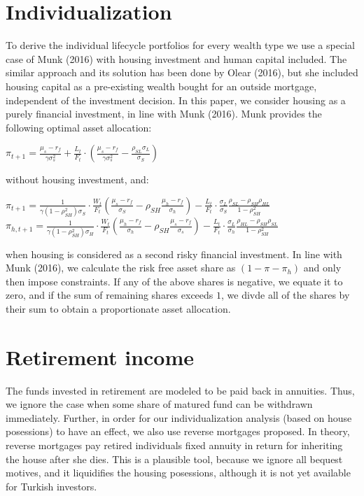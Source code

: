 \section{Individualization}

To derive the individual lifecycle portfolios for every wealth type we use a special case of Munk (2016) with housing investment and human capital included. The similar approach and its solution has been done by Olear (2016), but she included housing capital as a pre-existing wealth bought for an outside mortgage, independent of the investment decision. In this paper, we consider housing as a purely financial investment, in line with Munk (2016). Munk provides the following optimal asset allocation:


\begin{center}
	$\pi_{t+1} = \frac{\mu_s - r_f}{\gamma \sigma^2_s}  + \frac{L_t}{F_t} \cdot \left(\frac{\mu_s - r_f}{\gamma \sigma^2_s} - \frac{\rho_{SL}\sigma_L}{\sigma_S} \right)$
\end{center}

without housing investment, and:

\begin{center}
	$\pi_{t+1} = \frac{1}{\gamma (1 - \rho^2_{SH}) \sigma_S} \cdot \frac{W_t}{F_t} \left( \frac{\mu_s - r_f}{\sigma_S} - \rho_{SH} \frac{\mu_h - r_f}{\sigma_h} \right) - \frac{L_t}{F_t} \cdot \frac{\sigma_L}{\sigma_S} \frac{\rho_{SL} - \rho_{SH}\rho_{HL}}{1 - \rho^2_{SH}}$\\
	$\pi_{h,t+1} = \frac{1}{\gamma (1 - \rho^2_{SH}) \sigma_H} \cdot \frac{W_t}{F_t} \left( \frac{\mu_h - r_f}{\sigma_h} - \rho_{SH} \frac{\mu_s - r_f}{\sigma_s} \right) - \frac{L_t}{F_t} \cdot \frac{\sigma_L}{\sigma_h} \frac{\rho_{HL} - \rho_{SH}\rho_{SL}}{1 - \rho^2_{SH}}$
\end{center}

when housing is considered as a second risky financial investment. In line with Munk (2016), we calculate the risk free asset share as $\left( 1 - \pi - \pi_h \right)$ and only then impose constraints. If any of the above shares is negative, we equate it to zero, and if the sum of remaining shares exceeds $1$, we divde all of the shares by their sum to obtain a proportionate asset allocation. 

\section{Retirement income}

The funds invested in retirement are modeled to be paid back in annuities. Thus, we ignore the case when some share of matured fund can be withdrawn immediately. Further, in order for our individualization analysis (based on house posessions) to have an effect, we also use reverse mortgages proposed. In theory, reverse mortgages pay retired individuals fixed annuity in return for inheriting the house after she dies. This is a plausible tool, because we ignore all bequest motives, and it liquidifies the housing posessions, although it is not yet available for Turkish investors. 


